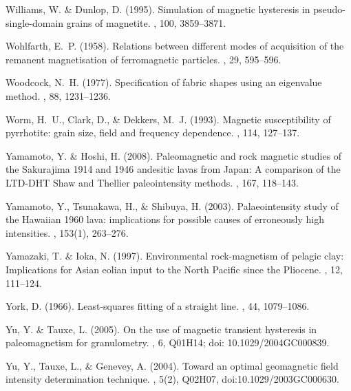 Williams, W. \& Dunlop, D. (1995).
\newblock Simulation of magnetic hysteresis in pseudo-single-domain grains of
  magnetite.
, 100, 3859--3871.

Wohlfarth, E.~P. (1958).
\newblock Relations between different modes of acquisition of the remanent
  magnetisation of ferromagnetic particles.
, 29, 595--596.

Woodcock, N.~H. (1977).
\newblock Specification of fabric shapes using an eigenvalue method.
, 88, 1231--1236.

Worm, H.~U., Clark, D., \& Dekkers, M.~J. (1993).
\newblock Magnetic susceptibility of pyrrhotite: grain size, field and
  frequency dependence.
, 114, 127--137.

Yamamoto, Y. \& Hoshi, H. (2008).
\newblock Paleomagnetic and rock magnetic studies of the Sakurajima 1914 and
  1946 andesitic lavas from Japan: A comparison of the LTD-DHT Shaw and
  Thellier paleointensity methods.
, 167, 118--143.

Yamamoto, Y., Tsunakawa, H., \& Shibuya, H. (2003).
\newblock Palaeointensity study of the Hawaiian 1960 lava: implications for
  possible causes of erroneously high intensities.
, 153(1), 263--276.

Yamazaki, T. \& Ioka, N. (1997).
\newblock Environmental rock-magnetism of pelagic clay: Implications for Asian
  eolian input to the North Pacific since the Pliocene.
, 12, 111--124.

York, D. (1966).
\newblock Least-squares fitting of a straight line.
, 44, 1079--1086.

Yu, Y. \& Tauxe, L. (2005).
\newblock On the use of magnetic transient hysteresis in paleomagnetism for
  granulometry.
, 6, Q01H14; doi:
  10.1029/2004GC000839.

Yu, Y., Tauxe, L., \& Genevey, A. (2004).
\newblock Toward an optimal geomagnetic field intensity determination
  technique.
, 5(2), Q02H07,
  doi:10.1029/2003GC000630.

